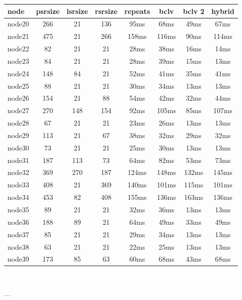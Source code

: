 \begin{tabular}{|l|c|c|c|c|c|c|c|}
\hline node & psrsize & lsrsize & rsrsize   & repeats & bclv & bclv 2 & hybrid\\
    \hline node20 & 266 & 21 & 136 & 95ms & 68ms & 49ms & 67ms\\
    \hline node21 & 475 & 21 & 266 & 158ms & 116ms & 90ms & 114ms\\
    \hline node22 & 82 & 21 & 21 & 28ms & 38ms & 16ms & 14ms\\
    \hline node23 & 84 & 21 & 21 & 28ms & 39ms & 15ms & 13ms\\
    \hline node24 & 148 & 84 & 21 & 52ms & 41ms & 35ms & 41ms\\
    \hline node25 & 88 & 21 & 21 & 30ms & 34ms & 13ms & 13ms\\
    \hline node26 & 154 & 21 & 88 & 54ms & 42ms & 32ms & 44ms\\
    \hline node27 & 270 & 148 & 154 & 92ms & 105ms & 85ms & 107ms\\
    \hline node28 & 67 & 21 & 21 & 23ms & 26ms & 13ms & 13ms\\
    \hline node29 & 113 & 21 & 67 & 38ms & 32ms & 29ms & 32ms\\
    \hline node30 & 73 & 21 & 21 & 25ms & 30ms & 13ms & 13ms\\
    \hline node31 & 187 & 113 & 73 & 64ms & 82ms & 53ms & 73ms\\
    \hline node32 & 369 & 270 & 187 & 124ms & 148ms & 132ms & 145ms\\
    \hline node33 & 408 & 21 & 369 & 140ms & 101ms & 115ms & 101ms\\
    \hline node34 & 453 & 82 & 408 & 155ms & 136ms & 163ms & 136ms\\
    \hline node35 & 89 & 21 & 21 & 32ms & 36ms & 13ms & 13ms\\
    \hline node36 & 188 & 89 & 21 & 64ms & 49ms & 33ms & 49ms\\
    \hline node37 & 85 & 21 & 21 & 29ms & 34ms & 13ms & 13ms\\
    \hline node38 & 63 & 21 & 21 & 22ms & 25ms & 13ms & 13ms\\
    \hline node39 & 173 & 85 & 63 & 60ms & 68ms & 43ms & 68ms\\

\hline
\end{tabular} \

---


